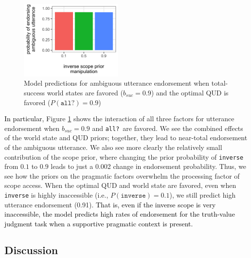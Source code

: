 \documentclass[cm]{glossa}
\newcommand{\lsp}[1]{\textcolor{red}{[lsp: #1]}}
\newcommand{\lp}[1]{\textcolor{black}{#1}} %
\begin{document}
\begin{figure}[ht]
\centering
\includegraphics[height=1.55in]{every-not-pragmatic-plot.png}
\caption{Model predictions for ambiguous utterance endorsement when total-success world states are favored ($b_{suc}=0.9$) and the optimal QUD is favored ($P(\texttt{all?}) = 0.9$)}
\label{fig:interaction}
\end{figure}


\lp{In particular,} Figure \ref{fig:interaction} shows the interaction of all three factors for utterance endorsement when $b_{suc}=0.9$ and \texttt{all?}~are favored. We see the combined effects of the world state and QUD priors; together, they lead to near-total endorsement of the ambiguous utterance. %
We also see more clearly the relatively small contribution of the scope prior, where changing the prior probability of \texttt{inverse} from $0.1$ to $0.9$ leads to just a 0.002 change in endorsement probability.  Thus, we see how the priors on the pragmatic  factors overwhelm the processing factor of scope access. When the optimal QUD and world state are favored, even when \texttt{inverse} is highly inaccessible (i.e., $P(\texttt{inverse}) = 0.1$), we still predict high utterance endorsement (0.91).
\lp{That is, even if the inverse scope is very inaccessible, the model predicts high rates of endorsement for the truth-value judgment task when a supportive pragmatic context is present.}

\subsection{Discussion}
\end{document}
